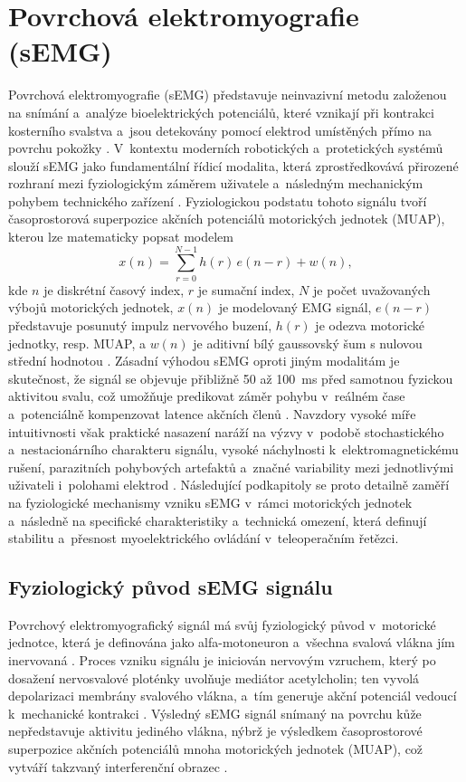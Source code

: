 \documentclass[FZS,DP]{tulthesis}
\begin{document}
\section{Povrchová elektromyografie (sEMG)}
Povrchová elektromyografie (sEMG) představuje neinvazivní metodu založenou na snímání a~analýze bioelektrických potenciálů, které vznikají při kontrakci kosterního svalstva a~jsou detekovány pomocí elektrod umístěných přímo na povrchu pokožky \cite{ALCAN20231026, Reaz2006, Wu2024613}.
V~kontextu moderních robotických a~protetických systémů slouží sEMG jako fundamentální řídicí modalita, která zprostředkovává přirozené rozhraní mezi fyziologickým záměrem uživatele a~následným mechanickým pohybem technického zařízení \cite{ALCAN20231026, Song2023823, Xiong2024}.
Fyziologickou podstatu tohoto signálu tvoří časoprostorová superpozice akčních potenciálů motorických jednotek (MUAP), kterou lze matematicky popsat modelem
%
\begin{equation}
    x(n) = \sum_{r=0}^{N-1} h(r)\,e(n-r) + w(n),
\end{equation}
%
kde $n$ je diskrétní časový index, $r$ je sumační index, $N$ je počet
uvažovaných výbojů motorických jednotek, $x(n)$ je modelovaný EMG
signál, $e(n-r)$ představuje posunutý impulz nervového buzení,
$h(r)$ je odezva motorické jednotky, resp. MUAP, a $w(n)$ je aditivní
bílý gaussovský šum s nulovou střední hodnotou \cite{Reaz2006}.
Zásadní výhodou sEMG oproti jiným modalitám je skutečnost, že signál se objevuje přibližně 50 až 100~ms před samotnou fyzickou aktivitou svalu, což umožňuje predikovat záměr pohybu v~reálném čase a~potenciálně kompenzovat latence akčních členů \cite{Song2023823, Xiong2024}.
Navzdory vysoké míře intuitivnosti však praktické nasazení naráží na výzvy v~podobě stochastického a~nestacionárního charakteru signálu, vysoké náchylnosti k~elektromagnetickému rušení, parazitních pohybových artefaktů a~značné variability mezi jednotlivými uživateli i~polohami elektrod \cite{Chowdhury2013917, DeLuca2010, Sul2025627, Song2023823}.
Následující podkapitoly se proto detailně zaměří na fyziologické mechanismy vzniku sEMG v~rámci motorických jednotek a~následně na specifické charakteristiky a~technická omezení, která definují stabilitu a~přesnost myoelektrického ovládání v~teleoperačním řetězci.
\subsection{Fyziologický původ sEMG signálu}
Povrchový elektromyografický signál má svůj fyziologický původ v~motorické jednotce, která je definována jako alfa-motoneuron a~všechna svalová vlákna jím inervovaná \cite{Reaz2006, Stuchla2024}.
Proces vzniku signálu je iniciován nervovým vzruchem, který po dosažení nervosvalové ploténky uvolňuje mediátor acetylcholin; ten vyvolá depolarizaci membrány svalového vlákna, a~tím generuje akční potenciál vedoucí k~mechanické kontrakci \cite{ALCAN20231026, Reaz2006, Stuchla2024}.
Výsledný sEMG signál snímaný na povrchu kůže nepředstavuje aktivitu jediného vlákna, nýbrž je výsledkem časoprostorové superpozice akčních potenciálů mnoha motorických jednotek (MUAP), což vytváří takzvaný interferenční obrazec \cite{ALCAN20231026, Chowdhury2013917, Reaz2006, Song2023823, Sul2025627}.
\end{document}
